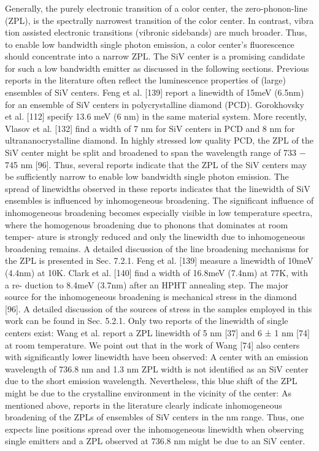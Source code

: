     \subsubsection{\zpl}

      Generally, the purely electronic transition of a color center, the zero-phonon-line (ZPL), is the spectrally narrowest transition of the color center. In contrast, vibra
      tion assisted electronic transitions (vibronic sidebands) are much broader. Thus, to enable low bandwidth single photon emission, a color center’s fluorescence should concentrate into a narrow ZPL. The SiV center is a promising candidate for such a low bandwidth emitter as discussed in the following sections.
      Previous reports in the literature often reflect the luminescence properties of (large) ensembles of SiV centers. Feng et al. [139] report a linewidth of 15meV (6.5nm) for an ensemble of SiV centers in polycrystalline diamond (PCD). Gorokhovsky et al. [112] specify 13.6 meV (6 nm) in the same material system. More recently, Vlasov et al. [132] find a width of 7 nm for SiV centers in PCD and 8 nm for ultrananocrystalline diamond. In highly stressed low quality PCD, the ZPL of the SiV center might be split and broadened to span the wavelength range of 733 − 745 nm [96]. Thus, several reports indicate that the ZPL of the SiV centers may be sufficiently narrow to enable low bandwidth single photon emission. The spread of linewidths observed in these reports indicates that the linewidth of SiV ensembles is influenced by inhomogeneous broadening. The significant influence of inhomogeneous broadening becomes especially visible in low temperature spectra, where the homogenous broadening due to phonons that dominates at room temper- ature is strongly reduced and only the linewidth due to inhomogeneous broadening remains. A detailed discussion of the line broadening mechanisms for the ZPL is presented in Sec. 7.2.1. Feng et al. [139] measure a linewidth of 10meV (4.4nm) at 10K. Clark et al. [140] find a width of 16.8meV (7.4nm) at 77K, with a re- duction to 8.4meV (3.7nm) after an HPHT annealing step. The major source for the inhomogeneous broadening is mechanical stress in the diamond [96]. A detailed discussion of the sources of stress in the samples employed in this work can be found in Sec. 5.2.1.
      Only two reports of the linewidth of single centers exist: Wang et al. report a ZPL linewidth of 5 nm [37] and 6 ± 1 nm [74] at room temperature. We point out that in the work of Wang [74] also centers with significantly lower linewidth have been observed: A center with an emission wavelength of 736.8 nm and 1.3 nm ZPL width is not identified as an SiV center due to the short emission wavelength. Nevertheless, this blue shift of the ZPL might be due to the crystalline environment in the vicinity of the center: As mentioned above, reports in the literature clearly indicate inhomogeneous broadening of the ZPLs of ensembles of SiV centers in the nm range. Thus, one expects line positions spread over the inhomogeneous linewidth when observing single emitters and a ZPL observed at 736.8 nm might be due to an SiV center.

